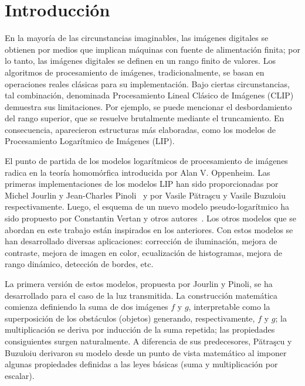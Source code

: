 \chapter*{Introducción}\label{chapter:introduction}

En la mayoría de las circunstancias imaginables, las imágenes digitales se obtienen por medios que implican máquinas con fuente de alimentación finita; por lo tanto, las imágenes digitales se definen en un rango finito de valores. Los algoritmos de procesamiento de imágenes, tradicionalmente, se basan en operaciones reales clásicas para su implementación. Bajo ciertas circunstancias, tal combinación, denominada Procesamiento Lineal Clásico de Imágenes (CLIP) demuestra sus limitaciones. Por ejemplo, se puede mencionar el desbordamiento del rango superior, que se resuelve brutalmente mediante el truncamiento. En consecuencia, aparecieron estructuras más elaboradas, como los modelos de Procesamiento Logarítmico de Imágenes (LIP).

El punto de partida de los modelos logarítmicos de procesamiento de imágenes radica en la teoría homomórfica introducida por Alan V. Oppenheim. Las primeras implementaciones de los modelos LIP han sido proporcionadas por Michel Jourlin y Jean-Charles Pinoli~\cite{jourlin1988model} y por Vasile Pătraşcu y Vasile Buzuloiu~\cite{patrascu2014mathematical} respectivamente. Luego, el esquema de un nuevo modelo pseudo-logarítmico ha sido propuesto por Constantin Vertan y otros autores~\cite{vertan2008pseudo}. Los otros modelos que se abordan en este trabajo est\'an inspirados en los anteriores. Con estos modelos se han desarrollado diversas aplicaciones: corrección de iluminación, mejora de contraste, mejora de imagen en color, ecualización de histogramas, mejora de rango dinámico, detección de bordes, etc.

La primera versi\'on de estos modelos, propuesta por Jourlin y Pinoli, se ha desarrollado para el caso de la luz transmitida. La construcción matemática comienza definiendo la suma de dos imágenes $f$ y $g$, interpretable como la superposición de los obstáculos (objetos) generando, respectivamente, $f$ y $g$; la multiplicación se deriva por inducción de la suma repetida; las propiedades consiguientes surgen naturalmente. A diferencia de sus predecesores, Pătraşcu y Buzuloiu derivaron su modelo desde un punto de vista matemático al imponer algunas propiedades definidas a las leyes básicas (suma y multiplicación por escalar).

